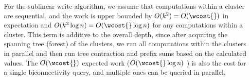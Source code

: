 For the sublinear-write algorithm, we assume that computations
within a cluster are sequential,
and the work is upper bounded by $O(k^2)=O(\wcost{})$ in expectation and $O(k^2\log n)=O(\wcost{}\log n)$ \whp{} for any computations within a cluster.
This term is additive to the overall depth, since after acquiring the spanning tree (forest) of the clusters, we run all computations within the clusters in parallel and then run tree contraction and prefix sums based on the calculated values.
The $O(\wcost{})$ expected work ($O(\wcost{}\log n)$ \whp{}) is also the cost for a single biconnectivity query, and multiple ones can be queried in parallel.


